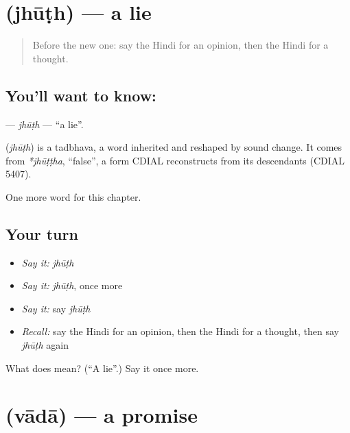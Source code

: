 \section[\texorpdfstring{\hi{झूठ} (jhūṭh)}{झूठ (jhūṭh)}]{ (jhūṭh) — a lie}

\label{lesson:HI-C206-jhuth}



\begin{quote}
Before the new one: say the Hindi for an opinion, then the Hindi for a thought.
\end{quote}

\subsection*{You'll want to know: }
\textbf{} — \emph{jhūṭh} — \textquotedblleft{}a lie\textquotedblright{}.

\begin{cousinweb}
\textbf{} (\emph{jhūṭh}) is a tadbhava, a word inherited and reshaped by sound change. It comes from \emph{*jhūṭṭha}, \textquotedblleft{}false\textquotedblright{}, a form CDIAL reconstructs from its descendants (CDIAL 5407).
\end{cousinweb}

\begin{grammarlens}[title={What you've built}]
One more word for this chapter.
\end{grammarlens}

\subsection*{Your turn}
\begin{itemize}
\raggedright
  \item \emph{Say it:} \emph{jhūṭh}
  \item \emph{Say it:} \emph{jhūṭh}, once more
  \item \emph{Say it:} say \emph{jhūṭh}
  \item \emph{Recall:} say the Hindi for an opinion, then the Hindi for a thought, then say \emph{jhūṭh} again
\end{itemize}

\begin{tcolorbox}[breakable,colback=teal!4,colframe=teal!35!black,title={Before you move on}]
What does  mean? (\textquotedblleft{}A lie\textquotedblright{}.) Say it once more.
\end{tcolorbox}
\section[\texorpdfstring{\hi{वादा} (vādā)}{वादा (vādā)}]{ (vādā) — a promise}

